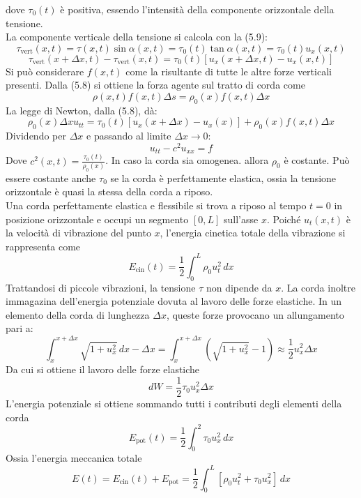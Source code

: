\documentclass[a4paper,12pt, draft]{article}
\theoremstyle{break}
\numberwithin{equation}{section}
\begin{document}
dove \(\tau_0(t)\) è positiva, essendo l'intensità della componente orizzontale della tensione. \\
La componente verticale della tensione si calcola con la (5.9):
\[
  \tau_{\text{vert}}(x,t) = \tau(x,t) \sin \alpha (x,t) = \tau_0(t) \tan \alpha (x,t) = \tau_0(t) u_x (x,t)
\]
\[
  \tau_{\text{vert}} (x + \Delta x, t) - \tau_{\text{vert}}(x,t) = \tau_0(t) [u_x(x+\Delta x, t) - u_x(x,t)]
\]
Si può considerare \(f(x,t)\) come la risultante di tutte le altre forze verticali presenti. Dalla (5.8) si ottiene la forza agente sul tratto di corda come 
\[
  \rho(x,t)f(x,t)\Delta s = \rho_0(x)f(x,t)\Delta x
\]
La legge di Newton, dalla (5.8), dà:
\[
\rho_0(x)\Delta x u_{tt} = \tau_0(t)[u_x(x+\Delta x) - u_x(x)] + \rho_0 (x)f(x,t) \Delta x
\]
Dividendo per \(\Delta x\) e passando al limite \(\Delta x \to 0\):
\begin{equation}
  u_{tt} - c^2u_{xx} = f
\end{equation} 
 Dove \(c^2(x,t) = \frac{\tau_0(t)}{\rho_0(x)}\). In caso la corda sia omogenea. allora \(\rho_0\) è costante. Può essere costante anche \(\tau_0\) se la corda è perfettamente elastica, ossia la tensione orizzontale è quasi la stessa della corda a riposo. \\
Una corda perfettamente elastica e flessibile si trova a riposo al tempo \(t = 0\) in posizione orizzontale e occupi un segmento \([0, L]\) sull'asse \(x\). Poiché \(u_t(x,t)\) è la velocità di vibrazione del punto \(x\), l'energia cinetica totale della vibrazione si rappresenta come 
\[
  E_{\text{cin}}(t) = \frac{1}{2}\int_0^L \rho_0 u^2_t \, dx
\]
Trattandosi di piccole vibrazioni, la tensione \(\tau\) non dipende da \(x\). La corda inoltre immagazina dell'energia potenziale dovuta al lavoro delle forze elastiche. In un elemento della corda di lunghezza \(\Delta x\), queste forze provocano un allungamento pari a:
\[
  \int_x^{x+\Delta x} \sqrt{1+u^2_x} \, dx - \Delta x = \int_x^{x + \Delta x} \left(\sqrt{1 + u_x^2} - 1\right) \approx \frac{1}{2} u_x^2 \Delta x
\]
Da cui si ottiene il lavoro delle forze elastiche
\[
  dW = \frac{1}{2} \tau_0u^2_x \Delta x
\]
L'energia potenziale si ottiene sommando tutti i contributi degli elementi della corda 
\begin{equation}
  E_{\text{pot}}(t) = \frac{1}{2} \int_0^2 \tau_0 u^2_x \, dx
\end{equation}
Ossia l'energia meccanica totale
\begin{equation}
  E(t) = E_{\text{cin}}(t) + E_{\text{pot}} = \frac{1}{2}\int_0^L [\rho_0 u^2_t + \tau_0 u^2_x] \, dx
\end{equation}
\end{document}
